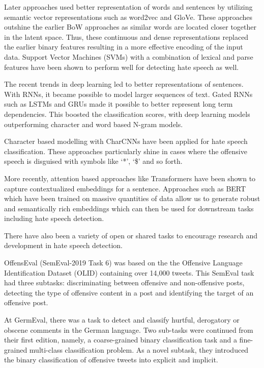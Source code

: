 \documentclass[
]{ceurart}
\begin{document}
Later approaches used better representation of words and sentences by utilizing semantic vector representations such as word2vec\cite{mikolov2013distributed} and GloVe\cite{pennington2014glove}. These approaches outshine the earlier BoW approaches as similar words are located closer together in the latent space. Thus, these continuous and dense representations replaced the earlier binary features resulting in a more effective encoding of the input data. Support Vector Machines (SVMs) with a combination of lexical and parse features have been shown to perform well for detecting hate speech as well.\cite{chen2012detecting}

The recent trends in deep learning led to better representations of sentences. With RNNs, it became possible to model larger sequences of text. Gated RNNs such as LSTMs\cite{sutskever2014sequence} and GRUs\cite{chung2014empirical} made it possible to better represent long term dependencies. This boosted the classification scores, with deep learning models outperforming character and word based N-gram models.\cite{badjatiya2017dlhate}

Character based modelling with CharCNNs\cite{zhang2015character} have been applied for hate speech classification. These approaches particularly shine in cases where the offensive speech is disguised with symbols like `*', `\$' and so forth.\cite{character-abuse}

More recently, attention based approaches like Transformers\cite{vaswani2017attention} have been shown to capture contextualized embeddings for a sentence. Approaches such as BERT\cite{devlin2018bert} which have been trained on massive quantities of data allow us to generate robust and semantically rich embeddings which can then be used for downstream tasks including hate speech detection. 


There have also been a variety of open or shared tasks to encourage research and development in hate speech detection. 

OffensEval (SemEval-2019 Task 6)\cite{zampieri-etal-2019-semeval} was based on the the Offensive Language Identification Dataset (OLID) containing over 14,000 tweets. This SemEval task had three subtasks: discriminating between offensive and non-offensive posts, detecting the type of offensive content in a post and identifying the target of an offensive post.

At GermEval,\cite{germeval-task-2} there was a task to detect and classify hurtful, derogatory or obscene comments in the German language. Two sub-tasks were continued from their first edition, namely, a coarse-grained binary classification task and a fine-grained multi-class classification problem. As a novel subtask, they introduced the binary classification of offensive tweets into explicit and implicit.
\end{document}
